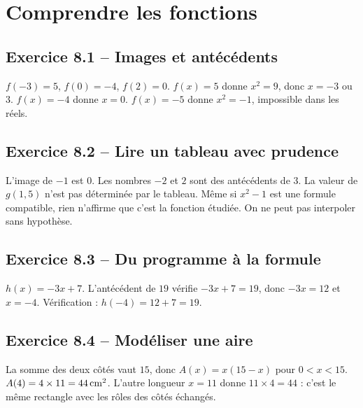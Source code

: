 \chapter{Comprendre les fonctions}
\label{corriges:08}
\section*{Exercice 8.1 -- Images et antécédents}
$f(-3)=5$, $f(0)=-4$, $f(2)=0$.
$f(x)=5$ donne $x^2=9$, donc $x=-3$ ou $3$.
$f(x)=-4$ donne $x=0$.
$f(x)=-5$ donne $x^2=-1$, impossible dans les réels.

\section*{Exercice 8.2 -- Lire un tableau avec prudence}
L'image de $-1$ est $0$. Les nombres $-2$ et $2$ sont des antécédents de $3$. La valeur de $g(1{,}5)$ n'est pas déterminée par le tableau. Même si $x^2-1$ est une formule compatible, rien n'affirme que c'est la fonction étudiée. On ne peut pas interpoler sans hypothèse.

\section*{Exercice 8.3 -- Du programme à la formule}
$h(x)=-3x+7$. L'antécédent de $19$ vérifie $-3x+7=19$, donc $-3x=12$ et $x=-4$. Vérification : $h(-4)=12+7=19$.

\section*{Exercice 8.4 -- Modéliser une aire}
La somme des deux côtés vaut $15$, donc $A(x)=x(15-x)$ pour $0<x<15$.
$A(4)=4\times11=44\,\mathrm{cm^2}$. L'autre longueur $x=11$ donne $11\times4=44$ : c'est le même rectangle avec les rôles des côtés échangés.
